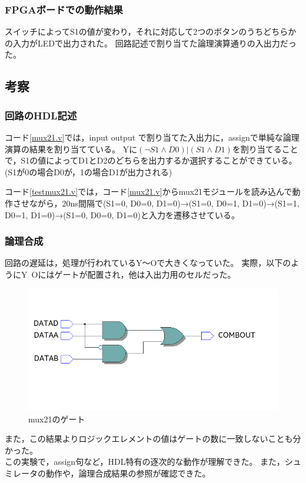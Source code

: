 \subsubsection{FPGAボードでの動作結果}
スイッチによってS1の値が変わり，それに対応して2つのボタンのうちどちらかの入力がLEDで出力された。
回路記述で割り当てた論理演算通りの入出力だった。

\subsection{考察}
\subsubsection{回路のHDL記述}
コード\ref{mux21.v}では，input output で割り当てた入出力に，assignで単純な論理演算の結果を割り当てている。
Yに$(\lnot{S1} \land D0)|(S1 \land D1)$を割り当てることで，S1の値によってD1とD2のどちらを出力するか選択することができている。
(S1が0の場合D0が，1の場合D1が出力される)

コード\ref{testmux21.v}では，コード\ref{mux21.v}からmux21モジュールを読み込んで動作させながら，20ns間隔で(S1=0, D0=0, D1=0)→(S1=0, D0=1, D1=0)→(S1=1, D0=1, D1=0)→(S1=0, D0=0, D1=0)と入力を遷移させている。

\subsubsection{論理合成}
回路の遅延は，処理が行われているY～Oで大きくなっていた。
実際，以下のようにY~Oにはゲートが配置され，他は入出力用のセルだった。

\begin{figure}[H]
  \centering
  \includegraphics[width=\linewidth]{./src/mux21/mux21elm.png}
  \caption{mux21のゲート}
\end{figure}

また，この結果よりロジックエレメントの値はゲートの数に一致しないことも分かった。\\

この実験で，assign句など，HDL特有の逐次的な動作が理解できた。
また，シュミレータの動作や，論理合成結果の参照が確認できた。
